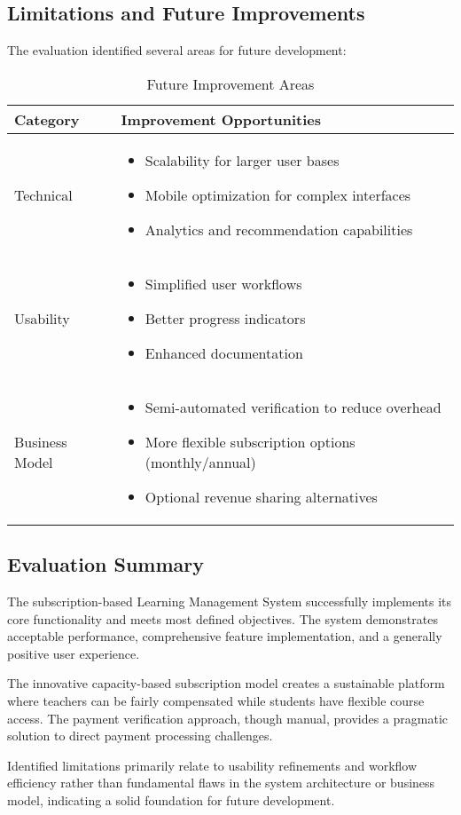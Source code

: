\subsection{Limitations and Future Improvements}

The evaluation identified several areas for future development:

\begin{table}[h]
\centering
\begin{tabular}{|p{3.5cm}|p{8cm}|}
\hline
\textbf{Category} & \textbf{Improvement Opportunities} \\
\hline
Technical & 
\begin{itemize}
    \item Scalability for larger user bases
    \item Mobile optimization for complex interfaces
    \item Analytics and recommendation capabilities
\end{itemize} \\
\hline
Usability & 
\begin{itemize}
    \item Simplified user workflows
    \item Better progress indicators
    \item Enhanced documentation
\end{itemize} \\
\hline
Business Model & 
\begin{itemize}
    \item Semi-automated verification to reduce overhead
    \item More flexible subscription options (monthly/annual)
    \item Optional revenue sharing alternatives
\end{itemize} \\
\hline
\end{tabular}
\caption{Future Improvement Areas}
\label{tab:improvements}
\end{table}

\subsection{Evaluation Summary}

The subscription-based Learning Management System successfully implements its core functionality and meets most defined objectives. The system demonstrates acceptable performance, comprehensive feature implementation, and a generally positive user experience.

The innovative capacity-based subscription model creates a sustainable platform where teachers can be fairly compensated while students have flexible course access. The payment verification approach, though manual, provides a pragmatic solution to direct payment processing challenges.

Identified limitations primarily relate to usability refinements and workflow efficiency rather than fundamental flaws in the system architecture or business model, indicating a solid foundation for future development.
